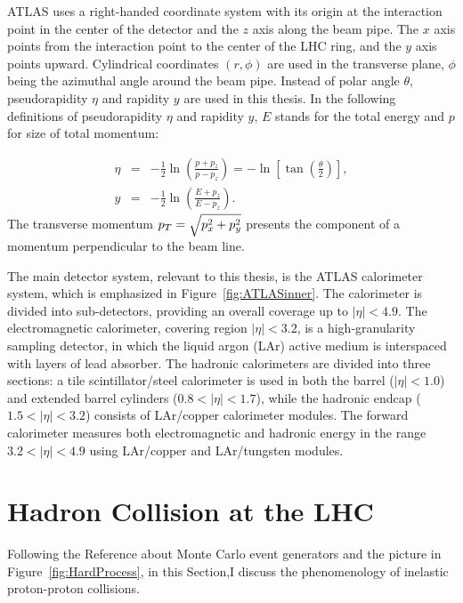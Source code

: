 ATLAS uses a right-handed coordinate system with its origin at the interaction
point in the center of the detector and the $z$ axis along the beam pipe. The
$x$ axis points from the interaction point to the center of the LHC ring, and
the $y$ axis points upward. Cylindrical coordinates $(r, \phi)$ are used in the
transverse plane, $\phi$ being the azimuthal angle around the beam pipe. Instead
of polar angle $\theta$, pseudorapidity $\eta$ and rapidity $y$ are used in this
thesis.  In the following definitions of pseudorapidity $\eta$ and rapidity $y$,
$E$ stands for the total energy and $p$ for size of total momentum: 

\begin{eqnarray}
  \eta &= & - \frac{1}{2} \ln \left( \frac{p+p_z}{p-p_z} \right) = - \ln \left[
  \tan \left( \frac{\theta}{2} \right) \right], \\ y &= &- \frac{1}{2} \ln
  \left( \frac{E+p_z}{E-p_z} \right).	
\end{eqnarray}
The transverse momentum $p_{T} = \sqrt{p_x^2 + p_y^2}$ presents the component of a
momentum perpendicular to the beam line.  

The main detector system, relevant to this thesis, is the ATLAS calorimeter system,
which is emphasized in Figure~\ref{fig:ATLASinner}. The calorimeter is divided
into sub-detectors, providing an overall coverage up to $|\eta| < 4.9$. The
electromagnetic calorimeter, covering region $|\eta| < 3.2$, is a
high-granularity sampling detector, in which the liquid argon (LAr) active medium
is interspaced with layers of lead absorber. The hadronic calorimeters are
divided into three sections: a tile scintillator/steel calorimeter is used in
both the barrel ($|\eta| < 1.0$) and extended barrel cylinders ($0.8 < |\eta| <
1.7$), while the hadronic endcap ($1.5 < |\eta| < 3.2$) consists of LAr/copper
calorimeter modules. The forward calorimeter measures both electromagnetic and
hadronic energy in the range $3.2 < |\eta| < 4.9$ using LAr/copper and
LAr/tungsten modules. 

\section{Hadron Collision at the LHC}

Following the Reference about Monte Carlo event generators \cite{PDG} and the
picture in Figure~\ref{fig:HardProcess}, in this Section,I discuss the
phenomenology of inelastic proton-proton collisions. 

